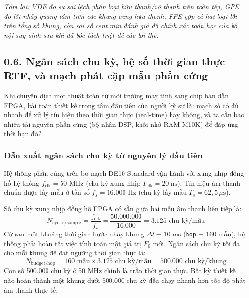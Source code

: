 \textit{Tóm lại: VDE đo sự sai lệch phân loại hữu thanh/vô thanh trên toàn tệp, GPE đo lỗi nhảy quãng tám trên các khung cùng hữu thanh, FFE gộp cả hai loại lỗi trên tổng số khung, còn sai số cent mịn đánh giá độ chính xác toán học của bộ nội suy đỉnh sau khi đã bóc tách triệt để các lỗi thô.}

\subsection*{0.6. Ngân sách chu kỳ, hệ số thời gian thực RTF, và mạch phát cặp mẫu phần cứng}

Khi chuyển dịch một thuật toán từ môi trường máy tính sang chip bán dẫn FPGA, bài toán thiết kế trọng tâm đầu tiên của người kỹ sư là: mạch số có đủ nhanh để xử lý tín hiệu theo thời gian thực (real-time) hay không, và ta cần bao nhiêu tài nguyên phần cứng (bộ nhân DSP, khối nhớ RAM M10K) để đáp ứng thời hạn đó? 

\subsubsection*{Dẫn xuất ngân sách chu kỳ từ nguyên lý đầu tiên}
Hệ thống phần cứng trên bo mạch DE10-Standard vận hành với xung nhịp đồng hồ hệ thống $f_{\text{clk}} = 50\text{ MHz}$ (chu kỳ xung nhịp $T_{\text{clk}} = 20\text{ ns}$). Tín hiệu âm thanh chuẩn được lấy mẫu ở tần số $f_s = 16.000\text{ Hz}$ (chu kỳ lấy mẫu $T_s = 62{,}5\ \mu\text{s}$).

Số chu kỳ xung nhịp đồng hồ FPGA có sẵn giữa hai mẫu âm thanh liên tiếp là:
\begin{equation}
N_{\text{cycles/sample}} = \frac{f_{\text{clk}}}{f_s} = \frac{50.000.000}{16.000} = 3.125\text{ chu kỳ/mẫu}
\end{equation}
Cứ sau một khoảng thời gian bước nhảy khung $\Delta t = 10\text{ ms}$ (\texttt{hop} = 160 mẫu), hệ thống phải hoàn tất việc tính toán một giá trị $F_0$ mới. Ngân sách chu kỳ tối đa cho mỗi khung để đạt ngưỡng thời gian thực là:
\begin{equation}
N_{\text{budget/hop}} = 160\text{ mẫu} \times 3.125\text{ chu kỳ/mẫu} = 500.000\text{ chu kỳ/khung}
\end{equation}
Con số 500.000 chu kỳ ở 50 MHz chính là trần thời gian thực. Bất kỳ thiết kế nào hoàn thành một khung dưới 500.000 chu kỳ đều chạy nhanh hơn tốc độ phát âm thanh thực tế.

